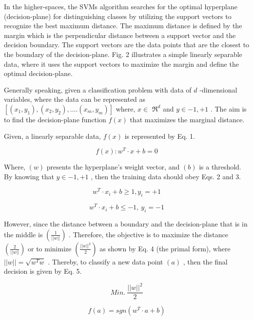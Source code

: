 \documentclass{article}
\begin{document}
In the higher-spaces, the SVMs algorithm searches for the optimal hyperplane (decision-plane) for distinguishing classes by utilizing the support vectors to recognize the best maximum distance. The maximum distance is defined by the margin which is the perpendicular distance between a support vector and the decision boundary. The support vectors are the data points that are the closest to the boundary of the decision-plane. Fig. 2 illustrates a simple linearly separable data, where it uses the support vectors to maximize the margin and define the optimal decision-plane.


Generally speaking, given a classification problem with data of $d$ -dimensional variables, where the data can be represented as $[(x_{1},y_{1}),(x_{2},y_{2}),....(x_{m},y_{m})]$ where, $x\in$ $\Re^{d}$ and $y\in{-1,+1}$ . The aim is to find the decision-plane function $f(x)$ that maximizes the marginal distance.


Given, a linearly separable data, $f(x)$ is represented by Eq. 1.


\begin{equation}
f(x):w^{T}\cdot x+b=0
\end{equation}


Where, $(w)$ presents the hyperplane’s weight vector, and $(b)$ is a threshold. By knowing that $y\in{-1,+1}$ , then the training data should obey Eqs. 2 and 3.


\begin{equation}
w^{T}\cdot x_{i}+b\geq1,y_{i}=+1
\end{equation}


\begin{equation}
w^{T}\cdot x_{i}+b\leq-1,~y_{i}=-1
\end{equation}


However, since the distance between a boundary and the decision-plane that is in the middle is $\left({\frac{1}{\left|\left|w\right|\right|}}\right)$ . Therefore, the objective is to maximize the distance $\left({\frac{2}{\left|\left|w\right|\right|}}\right)$ or to minimize $\left({\frac{||w||^{2}}{2}}\right)$ as shown by Eq. 4 (the primal form), where $||w||=\sqrt{w^{T}w}$ . Thereby, to classify a new data point $(a)$ , then the final decision is given by Eq. 5.


\begin{equation}
M i n.~\frac{||w||^{2}}{2}
\end{equation}


\begin{equation}
f(a)=s g n(w^{T}\cdot a+b)
\end{equation}
\end{document}
